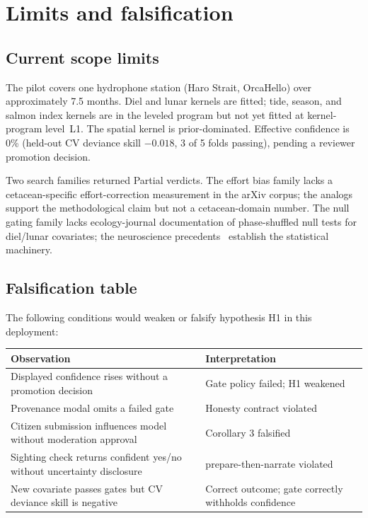 \section{Limits and falsification}

\subsection{Current scope limits}

The pilot covers one hydrophone station (Haro Strait, OrcaHello) over approximately 7.5 months. Diel and lunar kernels are fitted; tide, season, and salmon index kernels are in the leveled program but not yet fitted at kernel-program level~L1. The spatial kernel is prior-dominated. Effective confidence is 0\% (held-out CV deviance skill $-0.018$, 3 of 5 folds passing), pending a reviewer promotion decision.

Two search families returned Partial verdicts. The effort bias family lacks a cetacean-specific effort-correction measurement in the arXiv corpus; the analogs~\cite{arxiv190306669,arxiv211012951} support the methodological claim but not a cetacean-domain number. The null gating family lacks ecology-journal documentation of phase-shuffled null tests for diel/lunar covariates; the neuroscience precedents~\cite{arxiv201004875,arxiv150602361} establish the statistical machinery.

\subsection{Falsification table}

The following conditions would weaken or falsify hypothesis H1 in this deployment:

\begin{center}
\small
\begin{tabular}{@{}p{5.2cm}p{3.2cm}@{}}
  \toprule
  Observation & Interpretation \\
  \midrule
  Displayed confidence rises without a promotion decision & Gate policy failed; H1 weakened \\
  Provenance modal omits a failed gate & Honesty contract violated \\
  Citizen submission influences model without moderation approval & Corollary 3 falsified \\
  Sighting check returns confident yes/no without uncertainty disclosure & prepare-then-narrate violated \\
  New covariate passes gates but CV deviance skill is negative & Correct outcome; gate correctly withholds confidence \\
  \bottomrule
\end{tabular}
\end{center}

